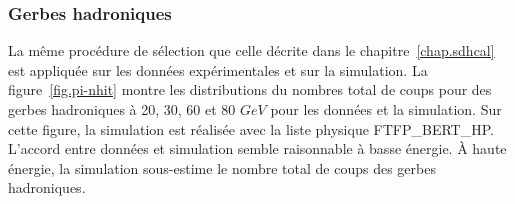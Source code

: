 \subsubsection{Gerbes hadroniques}
La même procédure de sélection que celle décrite dans le chapitre~\ref{chap.sdhcal} est appliquée sur les données expérimentales et sur la simulation. La figure~\ref{fig.pi-nhit} montre les distributions du nombres total de coups pour des gerbes hadroniques à 20, 30, 60 et 80 $GeV$ pour les données et la simulation. Sur cette figure, la simulation est réalisée avec la liste physique FTFP\_BERT\_HP. L'accord entre données et simulation semble raisonnable à basse énergie. À haute énergie, la simulation sous-estime le nombre total de coups des gerbes hadroniques.
\begin{figure}[!ht]

\end{figure}
